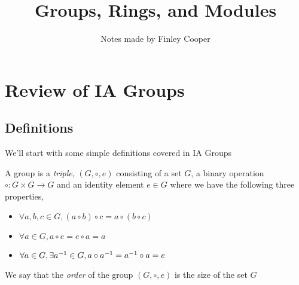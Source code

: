 \documentclass{article}
\title{Groups, Rings, and Modules}
\author{Notes made by Finley Cooper}
\begin{document}
  \maketitle
  \newpage
  \tableofcontents
  \newpage
  \section{Review of IA Groups}
  \subsection{Definitions}
  We'll start with some simple definitions covered in IA Groups
  \begin{definition}
	  A group is a \textit{triple}, $ (G,\circ,e) $ consisting of a set $ G $, a binary operation $ \circ:G\times G\rightarrow G $ and an identity element $ e\in G $ where we have the following three properties,
          \begin{itemize}	  
		  \item $ \forall a,b,c\in G, (a\circ b) \circ c =a\circ(b\circ c) $
	          \item $ \forall a\in G, a\circ e = e\circ a = a $
		  \item $ \forall a\in G, \exists {a}^{-1} \in G, a \circ {a}^{-1} = {a}^{-1} \circ a = e $
          \end{itemize}
  We say that the \textit{order} of the group $ (G,\circ, e) $ is the size of the set $ G $	
  \end{definition}
\end{document}
